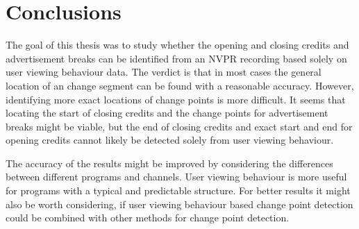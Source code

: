 

\section{Conclusions} \label{sec:conclusions} %

The goal of this thesis was to study whether the opening and closing credits and advertisement breaks can be identified from an NVPR recording based solely on user viewing behaviour data. The verdict is that in most cases the general location of an change segment can be found with a reasonable accuracy. However, identifying more exact locations of change points is more difficult. It seems that locating the start of closing credits and the change points for advertisement breaks might be viable, but the end of closing credits and exact start and end for opening credits cannot likely be detected solely from user viewing behaviour.

The accuracy of the results might be improved by considering the differences between different programs and channels. User viewing behaviour is more useful for programs with a typical and predictable structure. %
For better results it might also be worth considering, if user viewing behaviour based change point detection could be combined with other methods for change point detection. %

